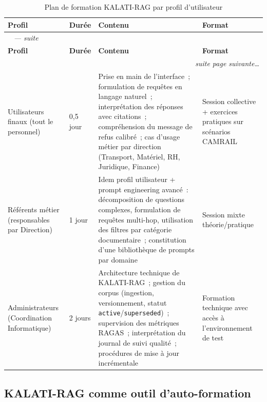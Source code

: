 \documentclass[12pt,a4paper]{report}
\begin{document}
\clearpage
\renewcommand{\arraystretch}{1.4}
\setlength{\LTleft}{0pt}
\setlength{\LTright}{0pt}
\begin{longtable}{@{} p{3.5cm} p{2cm} p{6.3cm} p{2.8cm} @{}}
\caption{Plan de formation KALATI-RAG par profil d'utilisateur}
\label{tab:formation}\\
\toprule
\textbf{Profil} & \textbf{Durée} & \textbf{Contenu} & \textbf{Format} \\
\midrule
\endfirsthead
\multicolumn{4}{l}{\footnotesize\tablename~\thetable{} \textit{--- suite}}\\[2pt]
\toprule
\textbf{Profil} & \textbf{Durée} & \textbf{Contenu} & \textbf{Format} \\
\midrule
\endhead
\midrule
\multicolumn{4}{r}{\footnotesize\textit{suite page suivante\ldots}}\\
\endfoot
\bottomrule
\endlastfoot
Utilisateurs finaux \newline (tout le personnel) &
0,5 jour &
Prise en main de l'interface~; formulation de requêtes en langage naturel~; interprétation
des réponses avec citations~; compréhension du message de refus calibré~; cas d'usage métier
par direction (Transport, Matériel, RH, Juridique, Finance) &
Session collective + exercices pratiques sur scénarios CAMRAIL \\
\addlinespace
Référents métier \newline (responsables par Direction) &
1 jour &
Idem profil utilisateur + prompt engineering avancé~: décomposition de questions complexes,
formulation de requêtes multi-hop, utilisation des filtres par catégorie documentaire~;
constitution d'une bibliothèque de prompts par domaine &
Session mixte théorie/pratique \\
\addlinespace
Administrateurs \newline (Coordination Informatique) &
2 jours &
Architecture technique de KALATI-RAG~; gestion du corpus (ingestion, versionnement, statut
\texttt{active}/\texttt{superseded})~; supervision des métriques RAGAS~; interprétation du
journal de suivi qualité~; procédures de mise à jour incrémentale &
Formation technique avec accès à l'environnement de test \\
\end{longtable}
\clearpage

\subsection{KALATI-RAG comme outil d'auto-formation}
\end{document}
